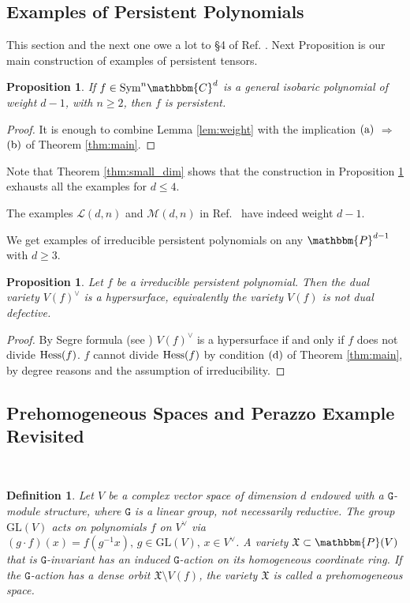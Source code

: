 \documentclass[aps,floatfix,groupedaddress,superscriptaddress,longbibliography,footinbib,notitlepage,showpacs]{revtex4-1}
\def\Hess{{\rm Hess}}
\newtheorem{proposition}[theorem]{Proposition}
\newtheorem{definition}[theorem]{Definition}
\begin{document}
\subsection{Examples of Persistent Polynomials}
This section and the next one owe a lot to \S 4  of Ref. \cite{CRS}. Next Proposition is our main construction of examples of persistent tensors.

\begin{proposition}\label{prop:construct}
If $f\in\text{Sym}^n\mathbbm{C}^d$ is a general isobaric polynomial of weight $d-1$, with $n\geq 2$,
then $f$ is persistent. 
\end{proposition}
\begin{proof}
It is enough to combine Lemma \ref{lem:weight} with the implication $(\textnormal{a})$ $\Longrightarrow$ $(\textnormal{b})$ of Theorem \ref{thm:main}.
\end{proof}

Note that Theorem \ref{thm:small_dim} shows that
the construction in Proposition \ref{prop:construct} exhausts all the examples for $d\leq 4$.

The examples $\mathcal{L}(d,n)$ and $\mathcal{M}(d,n)$ in Ref.~\cite[(29)-(30)]{GL24} have indeed weight $d-1$.

We get examples of irreducible persistent polynomials on any $\mathbbm{P}^{d-1}$ with $d\geq 3$.

\begin{proposition}
Let $f$ be a irreducible persistent polynomial. Then the dual variety $V(f)^\vee$ is a hypersurface, equivalently the variety $V(f)$ is not dual defective.
\end{proposition}

\begin{proof}
By Segre formula (see \cite[Lemma 7.2.7]{Ru}) $V(f)^\vee$ is a hypersurface if and only if $f$ does not divide $\Hess(f)$. $f$ cannot divide $\Hess(f)$ by condition $(\textnormal{d})$ of Theorem \ref{thm:main}, by degree reasons and the assumption of irreducibility.
\end{proof}

\subsection{Prehomogeneous Spaces and Perazzo Example Revisited}\

\begin{definition}
Let $V$ be a complex vector space of dimension $d$ endowed with a $\mathtt{G}$-module structure, where $\mathtt{G}$ is a linear group, not necessarily reductive.  
The group $\mathrm{GL}(V)$ acts on polynomials $f$ on $V^\vee$ via $(g \cdot f)(x) = f(g^{-1} x), \, g \in \mathrm{GL}(V), \, x \in V^\vee$. A variety $\mathfrak{X} \subset \mathbbm{P}(V)$ that is $\mathtt{G}$-invariant has an induced $\mathtt{G}$-action on its homogeneous coordinate ring. If the $\mathtt{G}$-action has a dense orbit  $\mathfrak{X} \setminus V(f)$, the variety $\mathfrak{X}$ is called a \emph{prehomogeneous space}.
\end{definition}
\end{document}
